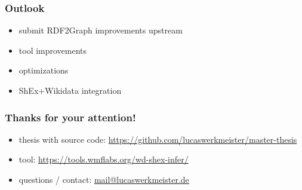 \documentclass[aspectratio=169]{beamer}
\begin{document}
\begin{frame}
  \frametitle{Outlook}
  \begin{itemize}
  \item submit RDF2Graph improvements upstream
  \item tool improvements
  \item optimizations
  \item ShEx+Wikidata integration
  \end{itemize}
\end{frame}

\begin{frame}
  \frametitle{Thanks for your attention!}
  \begin{itemize}
  \item thesis with source code: \url{https://github.com/lucaswerkmeister/master-thesis}
  \item tool: \url{https://tools.wmflabs.org/wd-shex-infer/}
  \item questions / contact: \href{mailto:mail@lucaswerkmeister.de}{mail@lucaswerkmeister.de}
  \end{itemize}
\end{frame}
\end{document}

